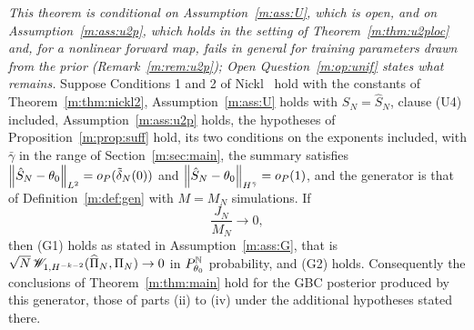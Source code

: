 \begin{theorem}\label{m:thm:qnnA}
\emph{This theorem is conditional on Assumption~\ref{m:ass:U}, which is open, and on Assumption~\ref{m:ass:u2p}, which holds in the setting of Theorem~\ref{m:thm:u2ploc} and, for a nonlinear forward map, fails in general for training parameters drawn from the prior (Remark~\ref{m:rem:u2p}); Open Question~\ref{m:op:unif} states what remains.} Suppose Conditions 1 and 2 of Nickl~\cite{nicklbvm2024} hold with the constants of Theorem~\ref{m:thm:nickl2}, Assumption~\ref{m:ass:U} holds with $S_N=\hat S_N$, clause (U4) included, Assumption~\ref{m:ass:u2p} holds, the hypotheses of Proposition~\ref{m:prop:suff} hold, its two conditions on the exponents included, with $\bar\gamma$ in the range of Section~\ref{m:sec:main}, the summary satisfies $\left\|\hat S_N-\theta_0\right\|_{L^2}=o_P(\tilde\delta_N(0))$ and $\left\|\hat S_N-\theta_0\right\|_{H^{\bar\gamma}}=o_P(1)$, and the generator is that of Definition~\ref{m:def:gen} with $M=M_N$ simulations. If
\[
\frac{J_N}{M_N}\to0 ,
\]
then (G1) holds as stated in Assumption~\ref{m:ass:G}, that is $\sqrt N\,\mathscr{W}_{1,H^{-k-2}}(\widehat\Pi_N,\Pi_N)\to0$ in $P^{\mathbb{N}}_{\theta_0}$ probability, and (G2) holds. Consequently the conclusions of Theorem~\ref{m:thm:main} hold for the GBC posterior produced by this generator, those of parts (ii) to (iv) under the additional hypotheses stated there.
\end{theorem}

